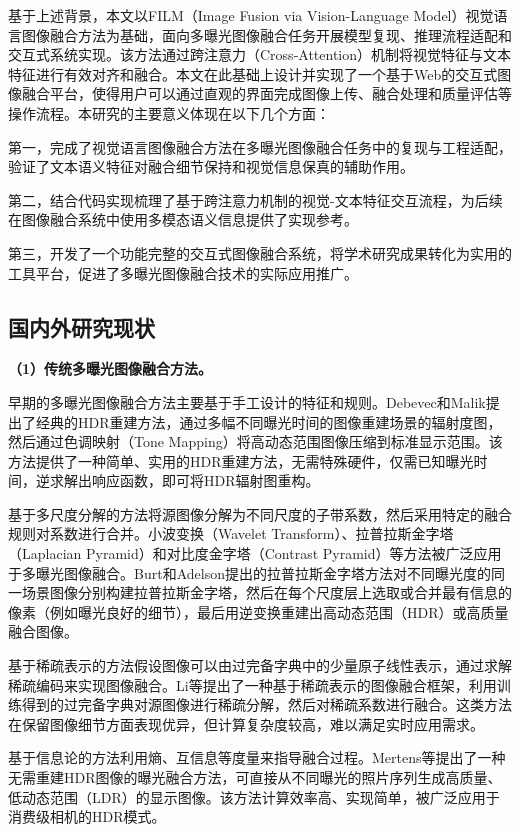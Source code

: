 基于上述背景，本文以FILM（Image Fusion via Vision-Language Model）视觉语言图像融合方法\supercite{zhao2024film}为基础，面向多曝光图像融合任务开展模型复现、推理流程适配和交互式系统实现。该方法通过跨注意力（Cross-Attention）机制将视觉特征与文本特征进行有效对齐和融合。本文在此基础上设计并实现了一个基于Web的交互式图像融合平台，使得用户可以通过直观的界面完成图像上传、融合处理和质量评估等操作流程。本研究的主要意义体现在以下几个方面：

第一，完成了视觉语言图像融合方法在多曝光图像融合任务中的复现与工程适配，验证了文本语义特征对融合细节保持和视觉信息保真的辅助作用。

第二，结合代码实现梳理了基于跨注意力机制的视觉-文本特征交互流程，为后续在图像融合系统中使用多模态语义信息提供了实现参考。

第三，开发了一个功能完整的交互式图像融合系统，将学术研究成果转化为实用的工具平台，促进了多曝光图像融合技术的实际应用推广。

\subsection{国内外研究现状}\label{sec:related_work}

\textbf{（1）传统多曝光图像融合方法。}

早期的多曝光图像融合方法主要基于手工设计的特征和规则。Debevec和Malik\supercite{debevec1997hdr}提出了经典的HDR重建方法，通过多幅不同曝光时间的图像重建场景的辐射度图，然后通过色调映射（Tone Mapping）将高动态范围图像压缩到标准显示范围。该方法提供了一种简单、实用的HDR重建方法，无需特殊硬件，仅需已知曝光时间，逆求解出响应函数，即可将HDR辐射图重构。

基于多尺度分解的方法将源图像分解为不同尺度的子带系数，然后采用特定的融合规则对系数进行合并。小波变换（Wavelet Transform）、拉普拉斯金字塔（Laplacian Pyramid）和对比度金字塔（Contrast Pyramid）等方法被广泛应用于多曝光图像融合。Burt和Adelson\supercite{burt1983laplacian}提出的拉普拉斯金字塔方法对不同曝光度的同一场景图像分别构建拉普拉斯金字塔，然后在每个尺度层上选取或合并最有信息的像素（例如曝光良好的细节），最后用逆变换重建出高动态范围（HDR）或高质量融合图像。

基于稀疏表示的方法假设图像可以由过完备字典中的少量原子线性表示，通过求解稀疏编码来实现图像融合。Li等\supercite{li2011sparse}提出了一种基于稀疏表示的图像融合框架，利用训练得到的过完备字典对源图像进行稀疏分解，然后对稀疏系数进行融合。这类方法在保留图像细节方面表现优异，但计算复杂度较高，难以满足实时应用需求。

基于信息论的方法利用熵、互信息等度量来指导融合过程。Mertens等\supercite{mertens2009exposure}提出了一种无需重建HDR图像的曝光融合方法，可直接从不同曝光的照片序列生成高质量、低动态范围（LDR）的显示图像。该方法计算效率高、实现简单，被广泛应用于消费级相机的HDR模式。


